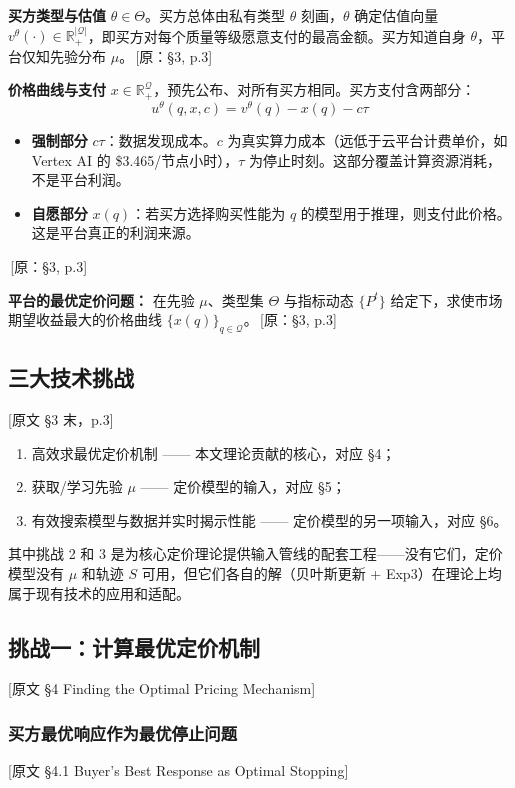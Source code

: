 \documentclass[12pt,a4paper]{article}
\newcommand{\srcref}[1]{\textcolor{black!65}{\footnotesize\,[原：#1]}}
\newcommand{\secref}[1]{\hspace{0.6em} \textcolor{black!80}{\footnotesize [原文 #1]}}
\theoremstyle{definition}
\begin{document}
\textbf{买方类型与估值} $\theta\in\Theta$。买方总体由私有类型 $\theta$ 刻画，$\theta$ 确定估值向量 $v^\theta(\cdot)\in\mathbb{R}_+^{|\mathcal{Q}|}$，即买方对每个质量等级愿意支付的最高金额。买方知道自身 $\theta$，平台仅知先验分布 $\mu$。\srcref{§3, p.3}

\textbf{价格曲线与支付} $x\in\mathbb{R}_+^{\mathcal{Q}}$，预先公布、对所有买方相同。买方支付含两部分：
\[
u^\theta(q,x,c) = v^\theta(q) - x(q) - c\tau
\]
\begin{itemize}[leftmargin=*]
    \item \textbf{强制部分} $c\tau$：数据发现成本。$c$ 为真实算力成本（远低于云平台计费单价，如 Vertex AI 的 \$3.465/节点小时），$\tau$ 为停止时刻。这部分覆盖计算资源消耗，不是平台利润。
    \item \textbf{自愿部分} $x(q)$：若买方选择购买性能为 $q$ 的模型用于推理，则支付此价格。这是平台真正的利润来源。
\end{itemize}
\srcref{§3, p.3}

\textbf{平台的最优定价问题：} 在先验 $\mu$、类型集 $\Theta$ 与指标动态 $\{P^t\}$ 给定下，求使市场期望收益最大的价格曲线 $\{x(q)\}_{q\in\mathcal{Q}}$。\srcref{§3, p.3}

\subsection{三大技术挑战}
\secref{§3 末，p.3}

\begin{enumerate}[label=(\arabic*)]
    \item 高效求最优定价机制 —— 本文理论贡献的核心，对应 §4；
    \item 获取/学习先验 $\mu$ —— 定价模型的输入，对应 §5；
    \item 有效搜索模型与数据并实时揭示性能 —— 定价模型的另一项输入，对应 §6。
\end{enumerate}
其中挑战 2 和 3 是为核心定价理论提供输入管线的配套工程——没有它们，定价模型没有 $\mu$ 和轨迹 $S$ 可用，但它们各自的解（贝叶斯更新 + Exp3）在理论上均属于现有技术的应用和适配。

\subsection{挑战一：计算最优定价机制}
\secref{§4 Finding the Optimal Pricing Mechanism}

\subsubsection{买方最优响应作为最优停止问题}
\secref{§4.1 Buyer's Best Response as Optimal Stopping}
\end{document}
